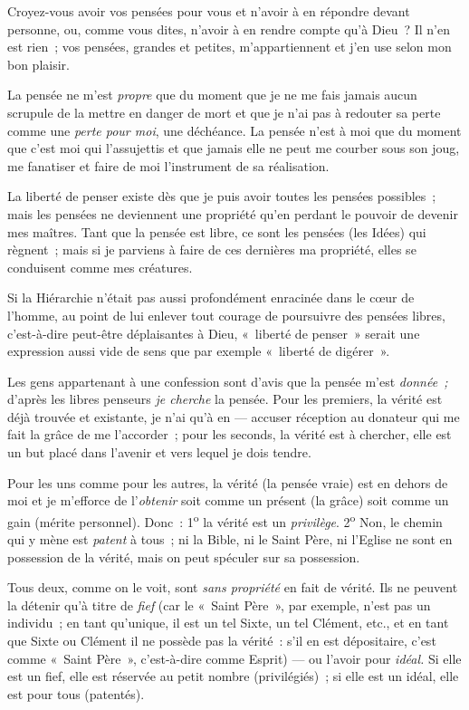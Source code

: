 \documentclass[french,twoside]{book} %
\begin{document}
Croyez-vous avoir vos pensées pour vous et n’avoir à en répondre devant personne, ou, comme vous dites, n’avoir à en rendre compte qu’à Dieu ? Il n’en est rien ; vos pensées, grandes et petites, m’appartiennent et j’en use selon mon bon plaisir.\par
La pensée ne m’est \emph{propre} que du moment que je ne me fais jamais aucun scrupule de la mettre en danger de mort et que je n’ai pas à redouter sa perte comme une \emph{perte pour moi}, une déchéance. La pensée n’est à moi que du moment que c’est moi qui l’assujettis et que jamais elle ne peut me courber sous son joug, me fanatiser et faire de moi l’instrument de sa réalisation.\par
La liberté de penser existe dès que je puis avoir toutes les pensées possibles ; mais les pensées ne deviennent une propriété qu’en perdant le pouvoir de devenir mes maîtres. Tant que la pensée est libre, ce sont les pensées (les Idées) qui règnent ; mais si je parviens à faire de ces dernières ma propriété, elles se conduisent comme mes créatures.\par
Si la Hiérarchie n’était pas aussi profondément enracinée dans le cœur de l’homme, au point de lui enlever tout courage de poursuivre des pensées libres, c’est-à-dire peut-être déplaisantes à Dieu, « liberté de penser » serait une expression aussi vide de sens que par exemple « liberté de digérer ».\par
Les gens appartenant à une confession sont d’avis que la pensée m’est \emph{donnée ;} d’après les libres penseurs \emph{je cherche} la pensée. Pour les premiers, la vérité est déjà trouvée et existante, je n’ai qu’à en — accuser réception au donateur qui me fait la grâce de me  l’accorder ; pour les seconds, la vérité est à chercher, elle est un but placé dans l’avenir et vers lequel je dois tendre.\par
Pour les uns comme pour les autres, la vérité (la pensée vraie) est en dehors de moi et je m’efforce de l’\emph{obtenir} soit comme un présent (la grâce) soit comme un gain (mérite personnel). Donc : 1\textsuperscript{o} la vérité est un \emph{privilège}. 2\textsuperscript{o} Non, le chemin qui y mène est \emph{patent} à tous ; ni la Bible, ni le Saint Père, ni l’Eglise ne sont en possession de la vérité, mais on peut spéculer sur sa possession.\par
Tous deux, comme on le voit, sont \emph{sans propriété} en fait de vérité. Ils ne peuvent la détenir qu’à titre de \emph{fief} (car le « Saint Père », par exemple, n’est pas un individu ; en tant qu’unique, il est un tel Sixte, un tel Clément, etc., et en tant que Sixte ou Clément il ne possède pas la vérité : s’il en est dépositaire, c’est comme « Saint Père », c’est-à-dire comme Esprit) — ou l’avoir pour \emph{idéal.} Si elle est un fief, elle est réservée au petit nombre (privilégiés) ; si elle est un idéal, elle est pour tous (patentés).\par
\end{document}
